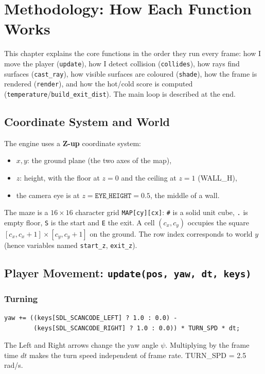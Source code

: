 \chapter{Methodology: How Each Function Works}

This chapter explains the core functions in the order they run every frame: how I move the player (\texttt{update}), how I detect collision (\texttt{collides}), how rays find surfaces (\texttt{cast\_ray}), how visible surfaces are coloured (\texttt{shade}), how the frame is rendered (\texttt{render}), and how the hot/cold score is computed (\texttt{temperature}/\texttt{build\_exit\_dist}). The main loop is described at the end.

\section{Coordinate System and World}

The engine uses a \textbf{Z-up} coordinate system:
\begin{itemize}
    \item $x, y$: the ground plane (the two axes of the map),
    \item $z$: height, with the floor at $z=0$ and the ceiling at $z=1$ (WALL\_H),
    \item the camera eye is at $z = \texttt{EYE\_HEIGHT} = 0.5$, the middle of a wall.
\end{itemize}
The maze is a $16\times16$ character grid \texttt{MAP[cy][cx]}: \texttt{\#} is a solid unit cube, \texttt{.} is empty floor, \texttt{S} is the start and \texttt{E} the exit. A cell $(c_x, c_y)$ occupies the square $[c_x, c_x+1]\times[c_y, c_y+1]$ on the ground. The row index corresponds to world $y$ (hence variables named \texttt{start\_z}, \texttt{exit\_z}).

\section{Player Movement: \texttt{update(pos, yaw, dt, keys)}}

\subsection{Turning}
\begin{verbatim}
yaw += ((keys[SDL_SCANCODE_LEFT] ? 1.0 : 0.0) -
        (keys[SDL_SCANCODE_RIGHT] ? 1.0 : 0.0)) * TURN_SPD * dt;
\end{verbatim}
The Left and Right arrows change the yaw angle $\psi$. Multiplying by the frame time $dt$ makes the turn speed independent of frame rate. TURN\_SPD = 2.5 rad/s.

